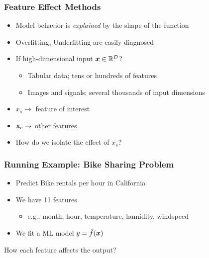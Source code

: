 \begin{frame}
  \frametitle{Feature Effect Methods}

  \begin{itemize}
  \item Model behavior is \emph{explained} by the shape of the function
  \item Overfitting, Underfitting are easily diagnosed
  \item If high-dimensional input \(\boldsymbol{x} \in \mathbb{R}^D\)?
    \begin{itemize}
    \item Tabular data; tens or hundreds of features
    \item Images and signals; several thousands of input dimensions
    \end{itemize}
  \item \(x_s \rightarrow \) feature of interest
  \item \(\mathbf{x}_c \rightarrow\) other features
  \item How do we isolate the effect of \(x_s\)?
  \end{itemize}
\end{frame}



\begin{frame}
  \frametitle{Running Example: Bike Sharing Problem}

  \begin{itemize}
  \item Predict Bike rentals per hour in California
  \item We have 11 features
    \begin{itemize}
    \item e.g., month, hour, temperature, humidity, windspeed
    \end{itemize}
  \item We fit a ML model \(y = \hat{f}(\boldsymbol{x})\)
  \end{itemize}
  \noindent\makebox[\linewidth]{\rule{\paperwidth}{0.4pt}}
  How each feature affects the output?
\end{frame}


